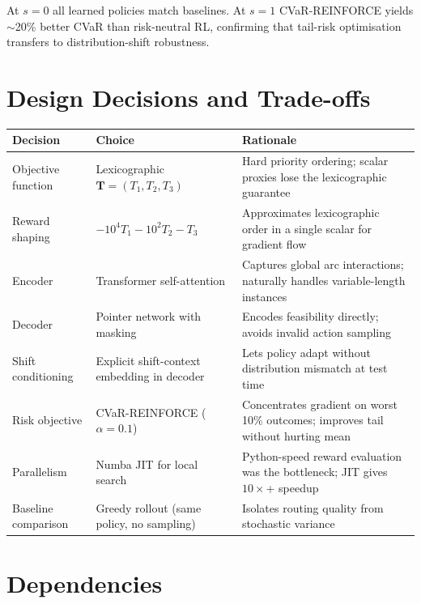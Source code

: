 \documentclass[11pt,a4paper]{article}
\begin{document}
At $s=0$ all learned policies match baselines. At $s=1$ CVaR-REINFORCE yields
$\sim$20\% better CVaR than risk-neutral RL, confirming that tail-risk
optimisation transfers to distribution-shift robustness.

\section{Design Decisions and Trade-offs}

\begin{center}
\begin{tabular}{p{3cm}p{4.5cm}p{5.5cm}}
\toprule
\textbf{Decision} & \textbf{Choice} & \textbf{Rationale} \\
\midrule
Objective function &
  Lexicographic $\mathbf{T}=(T_1,T_2,T_3)$ &
  Hard priority ordering; scalar proxies lose the lexicographic guarantee \\
Reward shaping &
  $-10^4 T_1 - 10^2 T_2 - T_3$ &
  Approximates lexicographic order in a single scalar for gradient flow \\
Encoder &
  Transformer self-attention &
  Captures global arc interactions; naturally handles variable-length instances \\
Decoder &
  Pointer network with masking &
  Encodes feasibility directly; avoids invalid action sampling \\
Shift conditioning &
  Explicit shift-context embedding in decoder &
  Lets policy adapt without distribution mismatch at test time \\
Risk objective &
  CVaR-REINFORCE ($\alpha=0.1$) &
  Concentrates gradient on worst 10\% outcomes; improves tail without hurting mean \\
Parallelism &
  Numba JIT for local search &
  Python-speed reward evaluation was the bottleneck; JIT gives $10\times$+ speedup \\
Baseline comparison &
  Greedy rollout (same policy, no sampling) &
  Isolates routing quality from stochastic variance \\
\bottomrule
\end{tabular}
\end{center}

\section{Dependencies}
\end{document}

